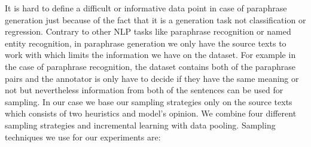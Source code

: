 It is hard to define a difficult or informative data point in case of paraphrase generation just because of the fact that it is a generation task not classification or regression. Contrary to other NLP tasks like paraphrase recognition or named entity recognition, in paraphrase generation we only have the source texts to work with which limits the information we have on the dataset. For example in the case of paraphrase recognition, the dataset contains both of the paraphrase pairs and the annotator is only have to decide if they have the same meaning or not but nevertheless information from both of the sentences can be used for sampling. In our case we base our sampling strategies only on the source texts which consists of two heuristics and model's opinion. We combine four different sampling strategies and incremental learning with data pooling. Sampling techniques we use for our experiments are:

